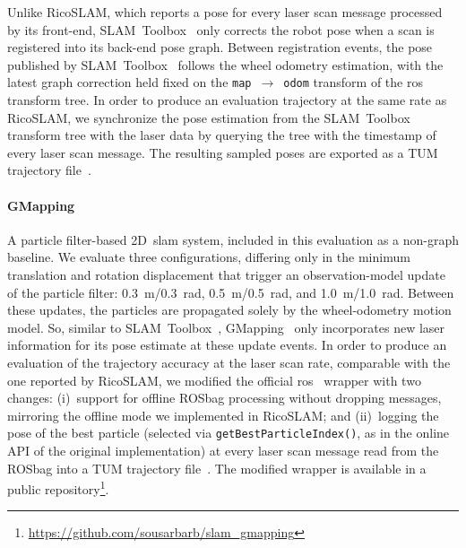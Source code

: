 Unlike RicoSLAM, which reports a pose for every laser scan message processed by
its front-end, SLAM~Toolbox~\cite{macenski-jambrecic:joss:2021} only
corrects the robot pose when a scan is registered into its back-end
pose graph. Between registration events, the pose published by
SLAM~Toolbox~\cite{macenski-jambrecic:joss:2021} follows the wheel odometry
estimation, with the latest graph correction held fixed on
the \texttt{map}~$\rightarrow$~\texttt{odom} transform
of the \gls{ros}~\cite{ros} transform tree.
In order to produce an evaluation trajectory at the same rate as RicoSLAM,
we synchronize the pose estimation from the
SLAM~Toolbox~\cite{macenski-jambrecic:joss:2021} transform tree with the laser
data by querying the tree with the timestamp of every laser scan message.
The resulting sampled poses are exported as a TUM trajectory
file~\cite{sturm:iros:2012}.

\paragraph{GMapping~\cite{grisetti:tro:2007}}
A particle filter-based 2D~\gls{slam} system, included in this evaluation as
a non-graph baseline. We evaluate three configurations, differing only in
the minimum translation and rotation displacement that trigger
an observation-model update of the particle filter:
\SI{0.3}{\metre}/\SI{0.3}{\radian},
\SI{0.5}{\metre}/\SI{0.5}{\radian}, and
\SI{1.0}{\metre}/\SI{1.0}{\radian}.
Between these updates, the particles are propagated solely by the
wheel-odometry motion model. So, similar to
SLAM~Toolbox~\cite{macenski-jambrecic:joss:2021},
GMapping~\cite{grisetti:tro:2007} only incorporates new laser information for
its pose estimate at these update events.
In order to produce an evaluation of the trajectory accuracy at the laser scan
rate, comparable with the one reported by RicoSLAM, we modified the official
\gls{ros}~\cite{ros} wrapper with two changes:
(i)~support for offline ROSbag processing without dropping messages, mirroring
the offline mode we implemented in RicoSLAM; and (ii)~logging the pose of the
best particle (selected via \texttt{getBestParticleIndex()}, as in the online
API of the original implementation) at every laser scan message read from
the ROSbag into a TUM trajectory file~\cite{sturm:iros:2012}. The modified
wrapper is available in a public
repository\footnote{\url{https://github.com/sousarbarb/slam_gmapping}}.

